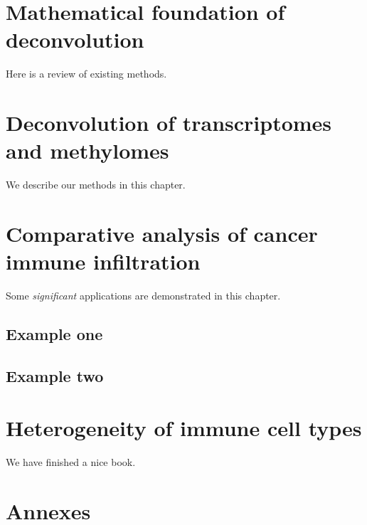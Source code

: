 \documentclass[12pt,]{book}
\theoremstyle{definition}
\theoremstyle{definition}
\theoremstyle{definition}
\theoremstyle{remark}
\begin{document}
\hypertarget{methods}{%
\chapter{Mathematical foundation of deconvolution}\label{methods}}

Here is a review of existing methods.

\hypertarget{deconvolution-of-transcriptomes-and-methylomes}{%
\chapter{Deconvolution of transcriptomes and
methylomes}\label{deconvolution-of-transcriptomes-and-methylomes}}

We describe our methods in this chapter.

\hypertarget{results}{%
\chapter{Comparative analysis of cancer immune
infiltration}\label{results}}

Some \emph{significant} applications are demonstrated in this chapter.

\hypertarget{example-one}{%
\section{Example one}\label{example-one}}

\hypertarget{example-two}{%
\section{Example two}\label{example-two}}

\hypertarget{map}{%
\chapter{Heterogeneity of immune cell types}\label{map}}

We have finished a nice book.

\hypertarget{annexes}{%
\chapter*{Annexes}\label{annexes}}


\end{document}
